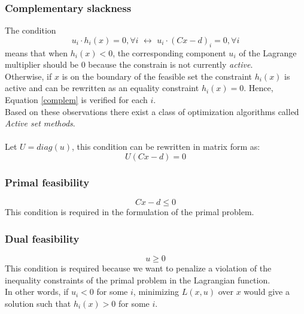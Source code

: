 \documentclass[]{article}
\begin{document}
\subsubsection*{Complementary slackness}
The condition
\begin{equation}
	\label{complem}
	u_i\cdot h_i(x)=0, \forall i 
	\,\, \longleftrightarrow \,\,
	u_i\cdot (Cx-d)_i=0, \forall i 
\end{equation}
means that when $h_i(x) < 0$, the corresponding component $u_i$ of the Lagrange multiplier should be 0 because the constrain is not currently \textit{active}.\\
Otherwise, if $x$ is on the boundary of the feasible set the constraint $h_i(x)$ is active and can be rewritten as an equality constraint $h_i(x) =0$. 
Hence, Equation \ref{complem} is verified for each $i$.\\
Based on these observations there exist a class of optimization algorithms called \textit{Active set methods}.\\\\
Let $U=diag(u)$, this condition can be rewritten in matrix form as:
\[ U(Cx-d) = 0 \]

\subsubsection*{Primal feasibility}
\[ Cx-d \leq 0\]
This condition is required in the formulation of the primal problem.

\subsubsection*{Dual feasibility}
\[ u\geq0 \]
This condition is required because we want to penalize a violation of the inequality constraints of the primal problem in the Lagrangian function.\\
In other words, if $u_i<0$ for some $i$, minimizing $L(x,u)$ over $x$ would give a solution such that $h_i(x)>0$ for some $i$.
\end{document}
